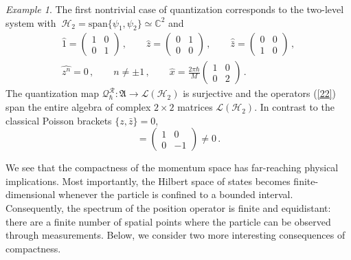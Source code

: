 \documentclass[12pt,a4paper]{article}
\numberwithin{equation}{section}
\theoremstyle{theorem}
\theoremstyle{remark}
\newtheorem{example}[equation]{Example}
\newcommand{\R}{\mathcal{R}}
\newcommand{\hh}{\mathcal{H}}
\newcommand{\fa}{\mathfrak{A}}
\newcommand{\qq}{\mathcal{Q}_{\hbar}}
\begin{document}
\begin{example} The first nontrivial case of quantization corresponds to the two-level system with 
$~{\mathcal{H}_2=\mathrm{span}\{ \psi_1,  \psi_2\}\simeq \mathbb{C}^2}$ and
\begin{equation}\label{22}
\begin{array}{c}
    \hat 1=\left(\begin{array}{cc}
        1 &0  \\
        0 & 1
    \end{array}\right)\,,\qquad \widehat{z}=\left(\begin{array}{cc}
        0 &1  \\
        0 & 0
    \end{array}\right)\,,\qquad \widehat{\bar z}=\left(\begin{array}{cc}
        0 &0  \\
        1 & 0
    \end{array}\right)\,,\\[7mm]
\widehat{z^n}=0\,,\qquad n\neq \pm 1\,, \qquad
 \displaystyle   \hat{x}=\frac{2\pi\hbar}{M}\left(\begin{array}{cc}
        1 &0 \\
        0 & 2
    \end{array}\right)\,.
    \end{array}
\end{equation}
The quantization map $\qq^\R: \fa\rightarrow \mathscr{L}(\mathcal{H}_2)$ is surjective and the operators (\ref{22}) span the entire algebra of complex  $2\times 2$ matrices $\mathscr{L}(\hh_2)$.
In contrast to the classical Poisson brackets $\{z,\bar z\}=0$, 
\begin{equation}
    [\widehat z,\widehat{\bar{z}}]=\left(\begin{array}{cc}
        1 &0  \\
        0 & -1
    \end{array}\right)\neq 0\,.
    \end{equation}
    
\end{example}

We see that the compactness of the momentum space has far-reaching physical implications. Most importantly,  the Hilbert space of states  becomes finite-dimensional whenever the particle is confined to a bounded interval. Consequently, the spectrum of the position operator is finite and equidistant: there are a finite number of spatial points where the particle can be observed through measurements.  Below, we consider two more interesting consequences of compactness. 
\end{document}
